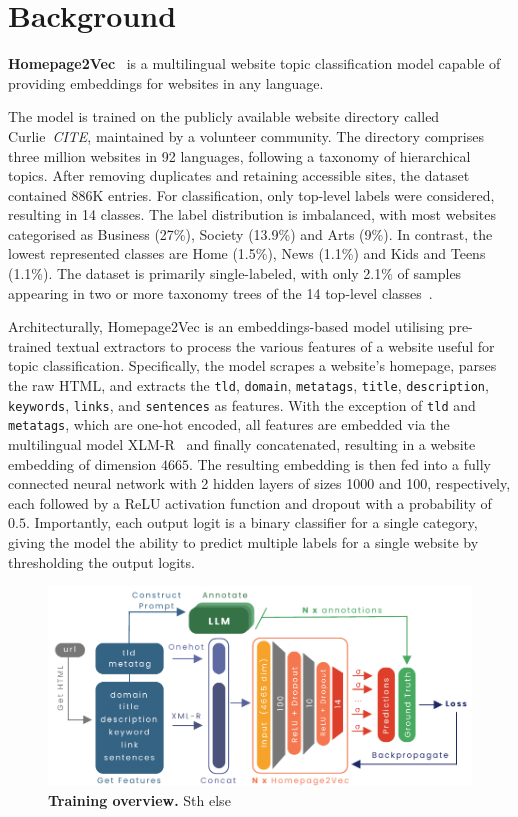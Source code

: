 \section{Background}
\label{sec:background}

\textbf{Homepage2Vec}~\cite{homepage2vec} is a multilingual website topic classification model capable of providing embeddings for websites in any language. 

The model is trained on the publicly available website directory called Curlie~\textit{CITE}, maintained by a volunteer community. The directory comprises three million websites in 92 languages, following a taxonomy of hierarchical topics. After removing duplicates and retaining accessible sites, the dataset contained 886K entries. For classification, only top-level labels were considered, resulting in 14 classes. The label distribution is imbalanced, with most websites categorised as Business (27\%), Society (13.9\%) and Arts (9\%). In contrast, the lowest represented classes are Home (1.5\%), News (1.1\%) and Kids and Teens (1.1\%). The dataset is primarily single-labeled, with only 2.1\% of samples appearing in two or more taxonomy trees of the 14 top-level classes~\cite{homepage2vec}.

Architecturally, Homepage2Vec is an embeddings-based model utilising pre-trained textual extractors to process the various features of a website useful for topic classification. Specifically, the model scrapes a website's homepage, parses the raw HTML, and extracts the \texttt{tld}, \texttt{domain}, \texttt{metatags}, \texttt{title}, \texttt{description}, \texttt{keywords}, \texttt{links}, and \texttt{sentences} as features. With the exception of \texttt{tld} and \texttt{metatags}, which are one-hot encoded, all features are embedded via the multilingual model XLM-R~\cite{xmlr} and finally concatenated, resulting in a website embedding of dimension $4665$. The resulting embedding is then fed into a fully connected neural network with 2 hidden layers of sizes 1000 and 100, respectively, each followed by a ReLU activation function and dropout with a probability of $0.5$. Importantly, each output logit is a binary classifier for a single category, giving the model the ability to predict multiple labels for a single website by thresholding the output logits. 

\begin{figure}[!ht]
    \centering
    \includegraphics[height=0.2\textheight, width=\columnwidth]{./figures/training_overview.pdf}
    \caption{\textbf{Training overview.} Sth else}
    \label{fig:train-overview}
\end{figure}

